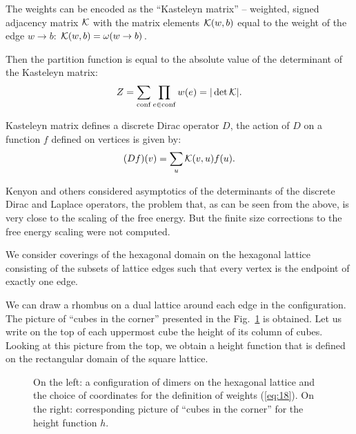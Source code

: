\documentclass{article}
\begin{document}
The weights can be encoded as the ``Kasteleyn matrix'' -- weighted, signed adjacency matrix ${\cal K}$ with
the matrix elements ${\cal K}(w,b)$ equal to the weight of the edge $w\to b$: ${\cal K}(w,b)=\omega(w\to b)$.

Then the partition function is equal to the absolute value of the determinant of the Kasteleyn
matrix\cite{P.W-1961,doi:10.1080/14786436108243366}: 
\begin{equation}
  \label{eq:15}
  Z=\sum_{\mathrm{conf}}\prod_{e\in \mathrm{conf}}w(e)=|\det {\cal K}|.
\end{equation}

Kasteleyn matrix defines a discrete Dirac operator $D$, the action of $D$ on a function $f$ defined
on vertices is given by:
\begin{equation}
  \label{eq:16}
  (Df)(v)=\sum_{u}{\cal K}(v,u) f(u).
\end{equation}

Kenyon \cite{kenyon2002laplacian,kenyon2000asymptotic} and others \cite{sridhar2015asymptotic}
considered asymptotics of the determinants of the discrete Dirac and Laplace operators, the problem
that, as can be seen from the above, is very close to the scaling of the free energy. But the finite
size corrections to the free energy scaling were not computed. 
  
We consider coverings of the hexagonal domain on the hexagonal lattice consisting of the subsets of
lattice edges such that every vertex is the endpoint of exactly one edge.

We can draw a rhombus on a dual lattice around each edge in the configuration. The picture of
``cubes in the corner'' presented in the Fig.~\ref{dhf} is obtained. Let us write on the top of each
uppermost cube the height of its column of cubes. Looking at this picture from the top, we obtain a
height function that is defined on the rectangular domain of the square lattice. 

\begin{figure}[htbp]
\caption{\label{dhf}On the left: a configuration of dimers on the hexagonal lattice and the choice of coordinates for the definition of weights (\ref{eq:18}). On the right: corresponding picture
  of ``cubes in the corner'' for the height function $h$.}
\end{figure}
\end{document}
